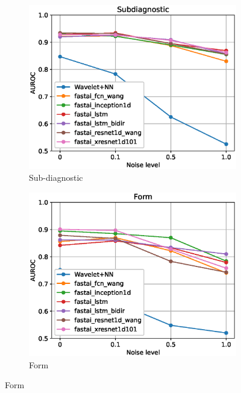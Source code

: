 \begin{figure}[hp]
\begin{subfigure}[b]{0.45\textwidth}
        \label{fig:gridsearch_superdiag}
     \end{subfigure}
     \hfill
      \begin{subfigure}[b]{0.45\textwidth}
        \includegraphics[width=1.0\textwidth]{images/noise_subdiagnostic.eps}
        \caption{Sub-diagnostic}
        \label{fig:gridsearch_subdiag}
     \end{subfigure}
     \hfill
     \begin{subfigure}[b]{0.45\textwidth}
        \includegraphics[width=1.0\textwidth]{images/noise_form.eps}
        \caption{Form}
        \label{fig:gridsearch_form}

\end{subfigure}
\end{figure}
